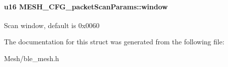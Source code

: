 \paragraph[{\texorpdfstring{window}{window}}]{\setlength{\rightskip}{0pt plus 5cm}u16 M\+E\+S\+H\+\_\+\+C\+F\+G\+\_\+packet\+Scan\+Params\+::window}\hypertarget{struct_m_e_s_h___c_f_g__packet_scan_params_a5691497117de2ca5b01e0e4ccb257f95}{}\label{struct_m_e_s_h___c_f_g__packet_scan_params_a5691497117de2ca5b01e0e4ccb257f95}
Scan window, default is 0x0060 

The documentation for this struct was generated from the following file\+:\begin{DoxyCompactItemize}
\item 
Mesh/ble\+\_\+mesh.\+h\end{DoxyCompactItemize}
